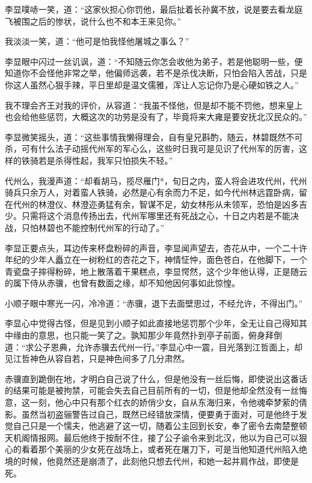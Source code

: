 李显噗哧一笑，道：“这家伙担心你罚他，最后扯着长孙冀不放，说是要去看龙庭飞被围之后的惨状，说什么也不和本王来见你。”

我淡淡一笑，道：“他可是怕我怪他屠城之事么？”

李显眼中闪过一丝讥讽，道：“不知随云你怎会收他为弟子，若是他聪明一些，便知道你不会怪他非常之举，他偏师远袭，若不是杀伐决断，只怕会陷入苦战，只是你这人虽然心狠手辣，平日里却是温文儒雅，浑让人忘记你乃是心硬如铁之人。”

我不理会齐王对我的评价，从容道：“我虽不怪他，但是却不能不罚他，想来皇上也会给他些惩罚，大概这次的功劳是没有了，毕竟将来大雍是要安抚北汉民众的。”

李显微笑摇头，道：“这些事情我懒得理会，自有皇兄斟酌，随云，林碧既然不可杀，可有什么法子动摇代州军的军心么，这些时日我可是见识了代州军的厉害，这样的铁骑若是杀得性起，我军只怕损失不轻。”

代州么，我漫声道：“却看胡马，揽尽雁门*，旬日之内，蛮人将会进攻代州，代州骑兵只余万人，对着蛮人铁骑，必然是心有余而力不足，如今代州林远霆卧病，留在代州的林澄仪、林澄迩勇猛有余，智谋不足，幼女林彤从未领军，恐怕是凶多吉少。只需将这个消息传扬出去，代州军哪里还有死战之心，十日之内若是不能决战，只怕林碧也不能控制代州军的行动了。”

李显正要点头，耳边传来杯盘粉碎的声音，李显闻声望去，杏花从中，一个二十许年纪的少年人矗立在一树粉红的杏花之下，神情怔忡，面色苍白，在他脚下，一个青瓷盘子摔得粉碎，地上散落着干果糕点，李显愕然，这个少年他认得，正是随云的属下侍从赤骥，也曾有数面之缘，却不知他因何事如此惊惶。

小顺子眼中寒光一闪，冷冷道：“赤骥，退下去面壁思过，不经允许，不得出门。”

李显心中觉得古怪，但是见到小顺子如此直接地惩罚那个少年，全无让自己得知其中缘由的意思，也只能一笑了之。孰知那少年竟然扑到亭子前面，俯身拜倒道：“求公子恩典，允许赤骥去代州一行。”李显心中一震，目光落到江哲面上，却见江哲神色从容自若，只是神色间多了几分肃然。

赤骥直到跪倒在地，才明白自己说了什么，但是他没有一丝后悔，即使说出这番话的结果可能是被拘禁，可能会失去自己目前所有的一切，但是他却全然没有一丝悔意，这一刻，他心中只有那个红衣的娇俏少女，自从东海归来，令他魂牵梦萦的倩影。虽然当初盗骊警告过自己，既然已经错放深情，便要勇于面对，可是他终于发觉自己只是一个懦夫，他逃避了这一切，随着公主回到长安，奉了密令去南楚整顿天机阁情报网。最后他终于按耐不住，接了公子谕令来到北汉，他以为自己可以狠心的看着那个美丽的少女死在战场上，或者死在屠刀下，可是当他知道代州陷入绝境的时候，他竟然还是崩溃了，此刻他只想去代州，和她一起并肩作战，即使是死。

